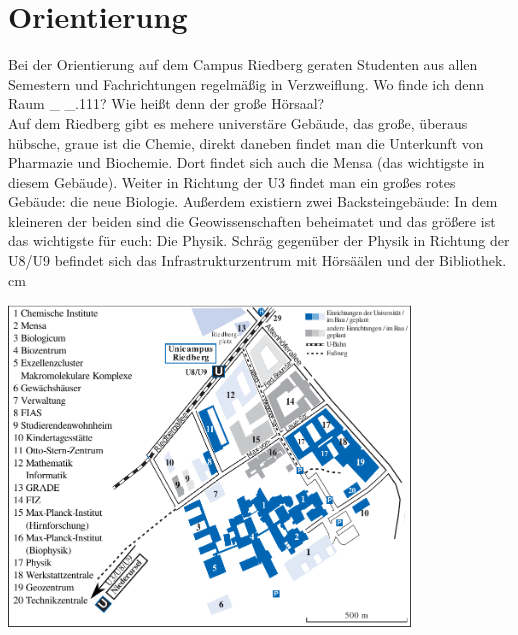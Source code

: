 \section{Orientierung}


Bei der Orientierung auf dem Campus Riedberg geraten Studenten
aus allen Semestern und Fachrichtungen regelmäßig in Verzweiflung.
Wo finde ich denn Raum \_ \_.111?
Wie heißt denn der große Hörsaal?\\
%
Auf dem Riedberg gibt es mehere universtäre Gebäude, das große, überaus hübsche, graue ist die Chemie,
direkt daneben findet man die Unterkunft von Pharmazie und Biochemie.
Dort findet sich auch die Mensa (das wichtigste in diesem Gebäude).
Weiter in Richtung der U3 findet man ein großes rotes Gebäude: die neue Biologie.
Außerdem existiern zwei Backsteingebäude:
In dem kleineren der beiden sind die Geowissenschaften beheimatet
und das größere ist das wichtigste für euch: Die Physik.
Schräg gegenüber der Physik in Richtung der U8/U9 befindet sich das Infrastrukturzentrum mit
Hörsäälen und der Bibliothek.
 cm

\begin{center}
    \includegraphics[width=0.80\textwidth]{bilder/riedberg-lageplan0.pdf}
\bigskip
\end{center}

\newpage


